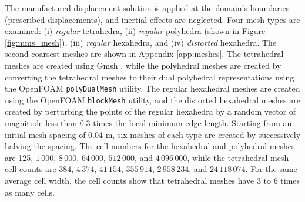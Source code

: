 \documentclass[sn-mathphys,Numbered]{sn-jnl}%
\begin{document}
The manufactured displacement solution is applied at the domain's boundaries (prescribed displacements), and inertial effects are neglected.
Four mesh types are examined:
(i) \emph{regular} tetrahedra, (ii) \emph{regular} polyhedra (shown in Figure \ref{fig:mms_mesh}), (iii) \emph{regular} hexahedra, and (iv) \emph{distorted} hexahedra.
The second coarsest meshes are shown in Appendix \ref{app:meshes}.
The tetrahedral meshes are created using Gmsh \citep{geuzaine2009gmsh}, while the polyhedral meshes are created by converting the tetrahedral meshes to their dual polyhedral representations using the OpenFOAM \texttt{polyDualMesh} utility.
The regular hexahedral meshes are created using the OpenFOAM \texttt{blockMesh} utility, and the distorted hexahedral meshes are created by perturbing the points of the regular hexahedra by a random vector of magnitude less than 0.3 times the local minimum edge length.
Starting from an initial mesh spacing of $0.04$ m, six meshes of each type are created by successively halving the spacing.
The cell numbers for the hexahedral and polyhedral meshes are 125, $1\,000$, $8\,000$, $64\,000$, $512\,000$, and $4\,096\,000$, while the tetrahedral mesh cell counts are 384, $4\,374$, $41\,154$, $355\,914$, $2\,958\,234$, and $24\,118\,074$.
For the same average cell width, the cell counts show that tetrahedral meshes have 3 to 6 times as many cells.
\end{document}
